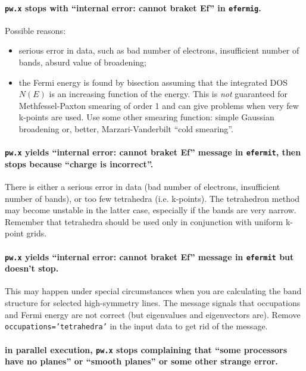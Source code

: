 \documentclass[12pt,a4paper]{article}
\begin{document}
\paragraph{\texttt{pw.x} stops with ``internal error: cannot braket Ef'' in
           \texttt{efermig}.}

Possible reasons:
\begin{itemize}
  \item
    serious error in data, such as bad number of electrons,
    insufficient number of bands, absurd value of broadening;
  \item
    the Fermi energy is found by bisection assuming that the
    integrated DOS $N(E)$ is an increasing function of the energy. 
    This is {\em not} guaranteed for Methfessel-Paxton smearing of
    order 1 and can give problems when very few k-points are used.
    Use some other smearing function: simple Gaussian broadening or,
    better, Marzari-Vanderbilt ``cold smearing''.
\end{itemize}

\paragraph{\texttt{pw.x} yields ``internal error: cannot braket Ef'' message
in \texttt{efermit}, then stops because ``charge is incorrect''.}

There is either a serious error in data (bad number of electrons, 
insufficient number of bands), or too few tetrahedra (i.e. k-points). 
The tetrahedron method may become unstable in the latter case, especially 
if the bands are very narrow. Remember that tetrahedra should be used only
in conjunction with uniform k-point grids.

\paragraph{\texttt{pw.x} yields ``internal error: cannot braket Ef'' message
in \texttt{efermit} but doesn't stop.}

This may happen under special circumstances when you are calculating the band 
structure for selected high-symmetry lines. The message signals that 
occupations and Fermi energy are not correct (but eigenvalues and eigenvectors 
are). Remove \texttt{occupations='tetrahedra'} in the input data to get rid of 
the message.

\paragraph{in parallel execution, \texttt{pw.x} stops complaining that
           ``some processors have no planes'' or ``smooth planes'' or
           some other strange error.}
\end{document}
